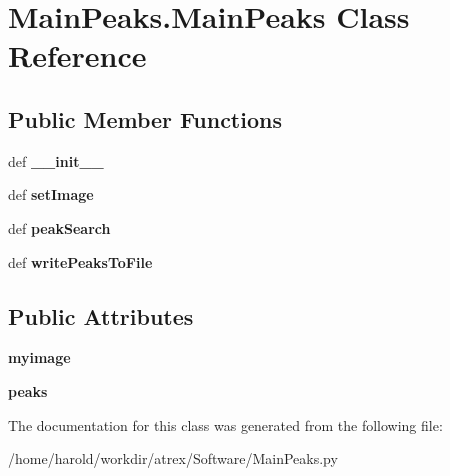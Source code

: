 \hypertarget{classMainPeaks_1_1MainPeaks}{\section{Main\-Peaks.\-Main\-Peaks Class Reference}
\label{classMainPeaks_1_1MainPeaks}
}
\subsection*{Public Member Functions}
\begin{DoxyCompactItemize}
\item 
\hypertarget{classMainPeaks_1_1MainPeaks_a8a133d3ee42e272cee3c30d8a1bb6b56}{def {\bfseries \-\_\-\-\_\-init\-\_\-\-\_\-}}\label{classMainPeaks_1_1MainPeaks_a8a133d3ee42e272cee3c30d8a1bb6b56}

\item 
\hypertarget{classMainPeaks_1_1MainPeaks_a6c85bd1ad41c9737aa86d98e447965b2}{def {\bfseries set\-Image}}\label{classMainPeaks_1_1MainPeaks_a6c85bd1ad41c9737aa86d98e447965b2}

\item 
\hypertarget{classMainPeaks_1_1MainPeaks_af353c28f582d469588714fa90f5cefd3}{def {\bfseries peak\-Search}}\label{classMainPeaks_1_1MainPeaks_af353c28f582d469588714fa90f5cefd3}

\item 
\hypertarget{classMainPeaks_1_1MainPeaks_a450255618019c923a86edbe454578f7b}{def {\bfseries write\-Peaks\-To\-File}}\label{classMainPeaks_1_1MainPeaks_a450255618019c923a86edbe454578f7b}

\end{DoxyCompactItemize}
\subsection*{Public Attributes}
\begin{DoxyCompactItemize}
\item 
\hypertarget{classMainPeaks_1_1MainPeaks_a3154ab9972004f57fe2e423781f07452}{{\bfseries myimage}}\label{classMainPeaks_1_1MainPeaks_a3154ab9972004f57fe2e423781f07452}

\item 
\hypertarget{classMainPeaks_1_1MainPeaks_a5c32a36556e49ae19ef9434048cc4a42}{{\bfseries peaks}}\label{classMainPeaks_1_1MainPeaks_a5c32a36556e49ae19ef9434048cc4a42}

\end{DoxyCompactItemize}


The documentation for this class was generated from the following file\-:\begin{DoxyCompactItemize}
\item 
/home/harold/workdir/atrex/\-Software/Main\-Peaks.\-py\end{DoxyCompactItemize}
